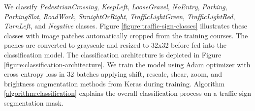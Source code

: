 We classify \textit{PedestrianCrossing}, \textit{KeepLeft}, \textit{LooseGravel},
\textit{NoEntry}, \textit{Parking}, \textit{ParkingSlot}, \textit{RoadWork},
\textit{StraightOrRight}, \textit{TrafficLightGreen}, \textit{TrafficLightRed},
\textit{TurnLeft}, and \textit{Negative} classes. Figure
\ref{figure:traffic-sign-classes} illustrates these classes with image patches
automatically cropped from the training courses. The paches are converted to
grayscale and resized to 32x32 before fed into the classification model. The
classification architecture is depicted in Figure
\ref{figure:classification-architecture}. We train the model using Adam
optimizer with cross entropy loss in 32 batches applying shift, rescale, shear,
zoom, and brightness augmentation methods from Keras during
training\cite{Abadi2015TF, Chollet2015Keras}. Algorithm
\ref{algorithm:classification} explains the overall classification process on a
traffic sign segmentation mask.

